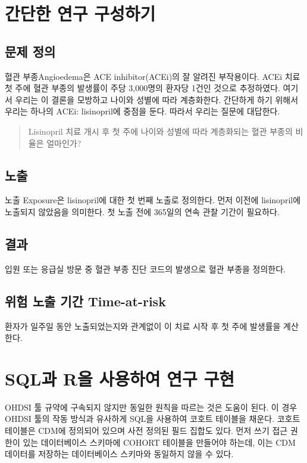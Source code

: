 \documentclass[10.5pt]{book}
\theoremstyle{definition}
\theoremstyle{definition}
\theoremstyle{definition}
\theoremstyle{remark}
\begin{document}
\section{간단한 연구 구성하기}\label{--}

\subsection{문제 정의}\label{-}

혈관 부종Angioedema은 ACE inhibitor(ACEi)의 잘 알려진 부작용이다.
\citep{slater_1988} ACEi 치료 첫 주에 혈관 부종의 발생률이 주당
3,000명의 환자당 1건인 것으로 추정하였다. 여기서 우리는 이 결론을
모방하고 나이와 성별에 따라 계층화한다. 간단하게 하기 위해서 우리는
하나의 ACEi: lisinopril에 중점을 둔다. 따라서 우리는 질문에 대답한다.

\begin{quote}
Lisinopril 치료 개시 후 첫 주에 나이와 성별에 따라 계층화되는 혈관
부종의 비율은 얼마인가?
\end{quote}

\subsection{노출}

노출 Exposure은 lisinopril에 대한 첫 번째 노출로 정의한다. 먼저 이전에
lisinopril에 노출되지 않았음을 의미한다. 첫 노출 전에 365일의 연속 관찰
기간이 필요하다.

\subsection{결과}

입원 또는 응급실 방문 중 혈관 부종 진단 코드의 발생으로 혈관 부종을
정의한다.

\subsection{위험 노출 기간 Time-at-risk}\label{---time-at-risk}

환자가 일주일 동안 노출되었는지와 관계없이 이 치료 시작 후 첫 주에
발생률을 계산한다.

\section{SQL과 R을 사용하여 연구 구현}\label{sql-r---}

OHDSI 툴 규약에 구속되지 않지만 동일한 원칙을 따르는 것은 도움이 된다.
이 경우 OHDSI 툴의 작동 방식과 유사하게 SQL을 사용하여 코호트 테이블을
채운다. 코호트 테이블은 CDM에 정의되어 있으며 사전 정의된 필드 집합도
있다. 먼저 쓰기 접근 권한이 있는 데이터베이스 스키마에 COHORT 테이블을
만들어야 하는데, 이는 CDM 데이터를 저장하는 데이터베이스 스키마와
동일하지 않을 수 있다.
\end{document}
